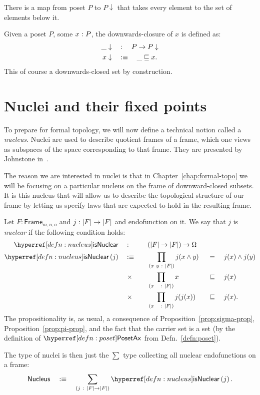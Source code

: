 There is a map from poset $P$ to $P\downarrow$ that takes every element to the set of elements
below it.

\begin{defn}\label{defn:down-clos}
  Given a poset $P$, some $x\hspace{0.1mm}:\hspace{0.1mm}P$, the downwards-closure of $x$ is defined as:
  \begin{align*}
    \_\downarrow \quad&:\quad P \rightarrow P\downarrow                   \\
    x\downarrow  \quad&:\equiv\quad \_ \sqsubseteq x  .
  \end{align*}
  This of course a downwards-closed set by construction.
\end{defn}

\section{Nuclei and their fixed points}\label{sec:nuclei}

To prepare for formal topology, we will now define a technical notion called a
\emph{nucleus}. Nuclei are used to describe quotient frames of a frame, which one views as
subspaces of the space corresponding to that frame. They are presented by Johnstone
in~\cite[Sec.~II.2]{stone-spaces}.

The reason we are interested in nuclei is that in Chapter~\ref{chap:formal-topo} we will
be focusing on a particular nucleus on the frame of downward-closed subsets. It is this
nucleus that will allow us to describe the topological structure of our frame by letting
us specify laws that are expected to hold in the resulting frame.
\begin{defn}[Nucleus]\label{defn:nucleus}
  Let $F : \mathsf{Frame}_{m, n, o}$ and $j : \left| F \right| \rightarrow \left| F \right|$ and endofunction on it.
  We say that $j$ is \emph{nuclear} if the following condition holds:
  \begin{alignat*}{4}
    \isnuclearnm{}\quad&:\quad &&(\abs{F} \rightarrow \abs{F}) \rightarrow \Omega && &&              \\
    \isnuclear{j} \quad&\is\quad
       &&\pity{x~y}{\abs{F}}{j(\meet{x}{y}) &&~=~ &&\meet{j(x)}{j(y)}}  \\
      &\hspace{0.3em}\times\quad &&\pity{x~~}{\abs{F}}{x &&~\sqsubseteq~ &&j(x)}           \\
      &\hspace{0.3em}\times\quad &&\pity{x~~}{\abs{F}}{j(j(x)) &&~\sqsubseteq~ &&j(x)}.
  \end{alignat*}
  The propositionality is, as usual, a consequence of Proposition~\ref{prop:sigma-prop},
  Proposition~\ref{prop:pi-prop}, and the fact that the carrier set is a set (by the
  definition of $\posetaxnm{}$ from Defn.~\ref{defn:poset}).

  The type of nuclei is then just the $\sum$ type collecting all nuclear endofunctions on a
  frame:
  \begin{equation*}
    \mathsf{Nucleus} \quad\is\quad \sigmaty{j}{\abs{F} \rightarrow \abs{F}}{\isnuclear{j}}.
  \end{equation*}
\end{defn}


